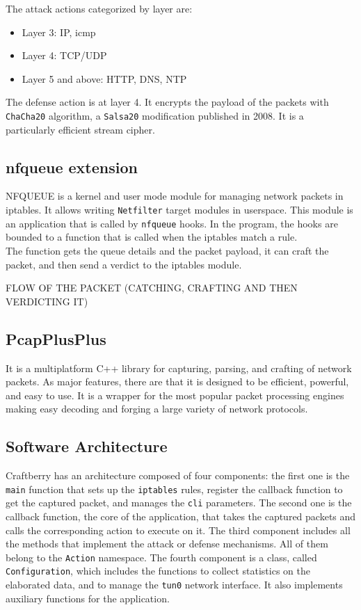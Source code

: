 \documentclass[12pt]{article}
\begin{document}
	\bigbreak
	
	The attack actions categorized by layer are:
	\begin{itemize}
		\item Layer 3: IP, icmp
		\item Layer 4: TCP/UDP
		\item Layer 5 and above: HTTP, DNS, NTP
	\end{itemize}

	\bigbreak
	The defense action is at layer 4. It encrypts the payload of the packets with \lstinline{ChaCha20} algorithm, a \lstinline{Salsa20} modification published in 2008. It is a particularly efficient stream cipher.\\

	\subsection{nfqueue extension}
	NFQUEUE is a kernel and user mode module for managing network packets in iptables. It allows writing \lstinline{Netfilter} target modules in userspace. This module is an application that is called by \lstinline{nfqueue} hooks. In the program, the hooks are bounded to a function that is called when the iptables match a rule.\\
	The function gets the queue details and the packet payload, it can craft the packet, and then send a verdict to the iptables module. 
	\bigbreak

	FLOW OF THE PACKET (CATCHING, CRAFTING AND THEN VERDICTING IT)

	\subsection{PcapPlusPlus}
	It is a multiplatform C++ library for capturing, parsing, and crafting of network packets. As major features, there are that it is designed to be efficient, powerful, and easy to use. It is a wrapper for the most popular packet processing engines making easy decoding and forging a large variety of network protocols.

	\subsection{Software Architecture}
	Craftberry has an architecture composed of four components: the first one is the \lstinline{main} function that sets up the \lstinline{iptables} rules, register the callback function to get the captured packet, and manages the \lstinline{cli} parameters. The second one is the callback function, the core of the application, that takes the captured packets and calls the corresponding action to execute on it. The third component includes all the methods that implement the attack or defense mechanisms. All of them belong to the \lstinline{Action} namespace. The fourth component is a class, called \lstinline{Configuration}, which includes the functions to collect statistics on the elaborated data, and to manage the \lstinline{tun0} network interface. It also implements auxiliary functions for the application.\\
\end{document}
